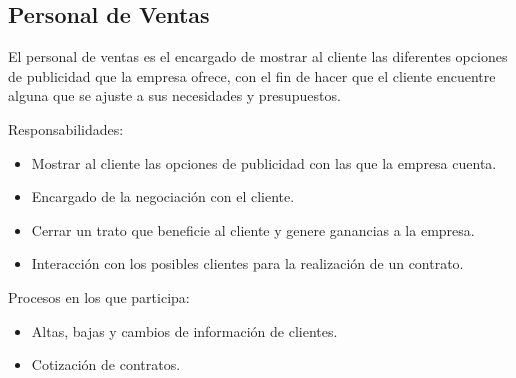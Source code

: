 \begin{Usuario}{\subsection{Personal de Ventas}}{
	El personal de ventas es el encargado de mostrar al cliente las diferentes opciones de publicidad que la empresa ofrece, con el fin de hacer que el cliente encuentre alguna que se ajuste a sus necesidades y presupuestos.\\
}
    \item[Responsabilidades:] \cdtEmpty
    \begin{itemize}
		\item Mostrar al cliente las opciones de publicidad con las que la empresa cuenta.
        \item Encargado de la negociación con el cliente.
        \item Cerrar un trato que beneficie al cliente y genere ganancias a la empresa.
        \item Interacción con los posibles clientes para la realización de un contrato.
    \end{itemize}

	\item[Procesos en los que participa:] \cdtEmpty
    \begin{itemize}
		\item Altas, bajas y cambios de información de clientes.
		\item Cotización de contratos.
    \end{itemize}
\end{Usuario}

